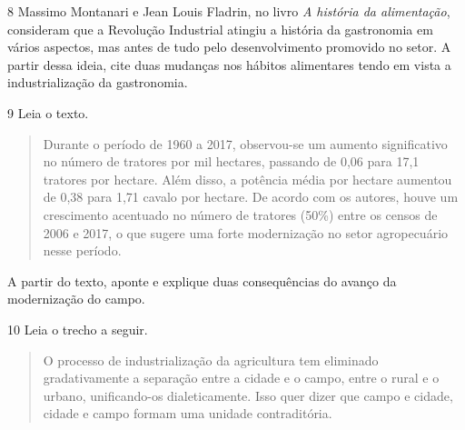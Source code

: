 
\num{8} Massimo Montanari e Jean Louis Fladrin, no livro \emph{A
história da alimentação}, consideram que a Revolução Industrial atingiu
a história da gastronomia em vários aspectos, mas antes de tudo pelo
desenvolvimento promovido no setor. A partir dessa ideia, cite duas
mudanças nos hábitos alimentares tendo em vista a industrialização da
gastronomia.


\num{9} Leia o texto.

\begin{quote}
Durante o período de 1960 a 2017, observou-se um aumento significativo
no número de tratores por mil hectares, passando de 0,06 para 17,1
tratores por hectare. Além disso, a potência média por hectare aumentou
de 0,38 para 1,71 cavalo por hectare. De acordo com os autores, houve um
crescimento acentuado no número de tratores (50\%) entre os censos de
2006 e 2017, o que sugere uma forte modernização no setor agropecuário
nesse período.

\end{quote}

A partir do texto, aponte e explique duas consequências do avanço da
modernização do campo.


\num{10} Leia o trecho a seguir.

\begin{quote}
O processo de industrialização da agricultura tem eliminado
gradativamente a separação entre a cidade e o campo, entre o rural e o
urbano, unificando-os dialeticamente. Isso quer dizer que campo e
cidade, cidade e campo formam uma unidade contraditória.

\end{quote}

